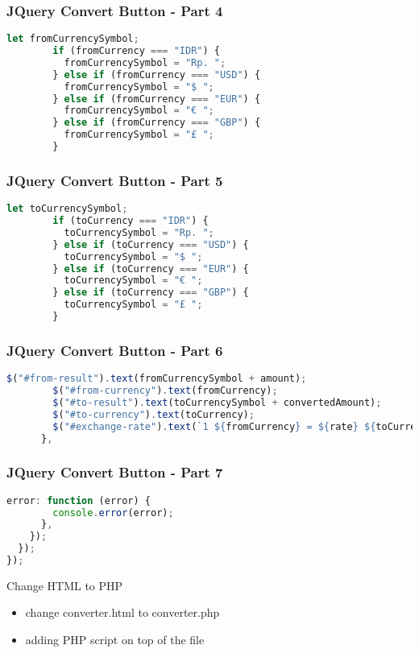 \documentclass[aspectratio=169, table]{beamer}
\begin{document}
\begin{frame}[fragile]
    \frametitle{JQuery Convert Button - Part 4}
    \begin{lstlisting}[language=JavaScript]
let fromCurrencySymbol;
        if (fromCurrency === "IDR") {
          fromCurrencySymbol = "Rp. ";
        } else if (fromCurrency === "USD") {
          fromCurrencySymbol = "$ ";
        } else if (fromCurrency === "EUR") {
          fromCurrencySymbol = "€ ";
        } else if (fromCurrency === "GBP") {
          fromCurrencySymbol = "£ ";
        }
    \end{lstlisting}
\end{frame}

\begin{frame}[fragile]
    \frametitle{JQuery Convert Button - Part 5}
    \begin{lstlisting}[language=JavaScript]
let toCurrencySymbol;
        if (toCurrency === "IDR") {
          toCurrencySymbol = "Rp. ";
        } else if (toCurrency === "USD") {
          toCurrencySymbol = "$ ";
        } else if (toCurrency === "EUR") {
          toCurrencySymbol = "€ ";
        } else if (toCurrency === "GBP") {
          toCurrencySymbol = "£ ";
        }
    \end{lstlisting}
\end{frame}

\begin{frame}[fragile]
    \frametitle{JQuery Convert Button - Part 6}
    \begin{lstlisting}[language=JavaScript]
$("#from-result").text(fromCurrencySymbol + amount);
        $("#from-currency").text(fromCurrency);
        $("#to-result").text(toCurrencySymbol + convertedAmount);
        $("#to-currency").text(toCurrency);
        $("#exchange-rate").text(`1 ${fromCurrency} = ${rate} ${toCurrency}`);
      },
    \end{lstlisting}
\end{frame}

\begin{frame}[fragile]
    \frametitle{JQuery Convert Button - Part 7}
    \begin{lstlisting}[language=JavaScript]
error: function (error) {
        console.error(error);
      },
    });
  });
});
    \end{lstlisting}
\end{frame}

\begin{frame}{Change HTML to PHP}
    \vskip-1cm
    \begin{itemize}
        \item change converter.html to converter.php
        \item adding PHP script on top of the file
    \end{itemize}
\end{frame}
\end{document}
